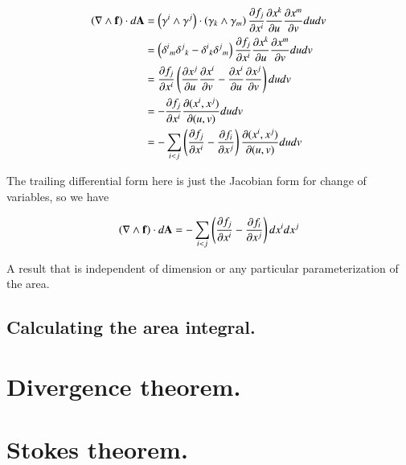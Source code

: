 \documentclass{article}
\newcommand{\grad}[0]{\nabla}
\newcommand{\PD}[2]{\frac{\partial {#2}}{\partial {#1}}}
\begin{document}
\begin{align*}
\left(\grad \wedge \Bf\right) \cdot d\BA
&= \left( \gamma^i \wedge \gamma^j \right) \cdot \left(\gamma_k \wedge \gamma_m \right) \PD{x^{i}}{f_j} \PD{u}{x^k} \PD{v}{x^m} du dv \\
&= \left( {\delta^i}_m {\delta^j}_k -{\delta^i}_k {\delta^j}_m \right) \PD{x^{i}}{f_j} \PD{u}{x^k} \PD{v}{x^m} du dv \\
&= \PD{x^{i}}{f_j} \left( \PD{u}{x^j} \PD{v}{x^i} -\PD{u}{x^i} \PD{v}{x^j} \right) du dv \\
&= -\PD{x^{i}}{f_j} \PD{(u,v)}{(x^i, x^j)} du dv \\
&= -\sum_{i<j} \left( \PD{x^{i}}{f_j} -\PD{x^{j}}{f_i} \right) \PD{(u,v)}{(x^i, x^j)} du dv \\
\end{align*}

The trailing differential form here is just the Jacobian form for change of variables, so we have

\begin{align}
\left(\grad \wedge \Bf\right) \cdot d\BA
= -\sum_{i<j} \left( \PD{x^{i}}{f_j} -\PD{x^{j}}{f_i} \right) dx^i dx^j
\end{align}

A result that is independent of dimension or any particular parameterization of the area.

\subsection{ Calculating the area integral. }

\section{ Divergence theorem. }

\section{ Stokes theorem. }
\end{document}
